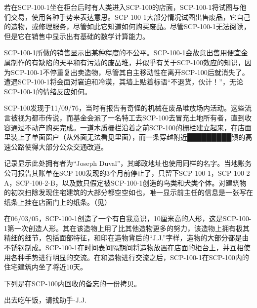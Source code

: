 若在SCP-100-1坐在柜台后时有人类进入SCP-100的店面，SCP-100-1将试图与他们交易，使用各种手势来表达意思。SCP-100-1大部分情况试图出售废品，它自己的造物，或修理服务，尽管如此它知道如何购买废品。尽管SCP-100-1无法阅读，但是它在销售中显示出有基础的数学计算能力。

SCP-100-1所做的销售显示出某种程度的不公平。SCP-100-1会故意出售用便宜金属制作的有缺陷的天平和有污渍的废品堆，并似乎有关于SCP-100效应的知识，因为SCP-100-1不停重复出卖造物，尽管其自主移动性在离开SCP-100后就消失了。遭遇SCP-100-1将会面对窘迫和冷漠，其墙上贴着标语“不退货，伙计！”，无论SCP-100-1的情绪反应如何。

SCP-100发现于11\slash 09\slash 76，当时有报告有奇怪的机械在废品堆放场内活动。这些流言被视为都市传说，而基金会派了一名特工去SCP-100去冒充土地所有者，直到收容通过不动产购买完成。一道木质栅栏沿着之前SCP-100的栅栏建立起来，在店面里装上了单面窗户（从外面无法看见里面），而一条穿越附近█████████镇的高速公路使得大部分公众交通改道。

记录显示此处拥有者为“Joseph Duval”，其邮政地址也使用同样的名字。当地账务公司报告其账单在SCP-100发现的3个月前停止了，只留下SCP-100-1，SCP-100-2-A，SCP-100-2-B，以及数只假定被SCP-100-1创造的鸟类和犬类个体。对建筑物的初次扫除发现住宅建筑的大部分都空空如也，唯一显示前主任的信息是一张写在纸条上挂在店面门上的纸条。（见）

在06\slash 03\slash 05，SCP-100-1创造了一个有自我意识，10厘米高的人形，这是SCP-100-1第一次创造人形。其在该造物上用了比其他造物更多的努力，该造物上拥有极其精细的细节，包括面部特征，和印在造物背后的“J.J.”字样，造物的大部分都是由不锈钢制成。SCP-100-1在时间表间隔期间将造物放置在店面的柜台上，并互相使用各种手势进行明显的交流。在和造物进行交流之后，SCP-100-1在SCP-100内的住宅建筑内坐了将近10天。

下列是在SCP-100内回收的备忘的一份拷贝。

\begin{scpbox}
\centering
出去吃午饭，请找助手-J.J.
\end{scpbox}
